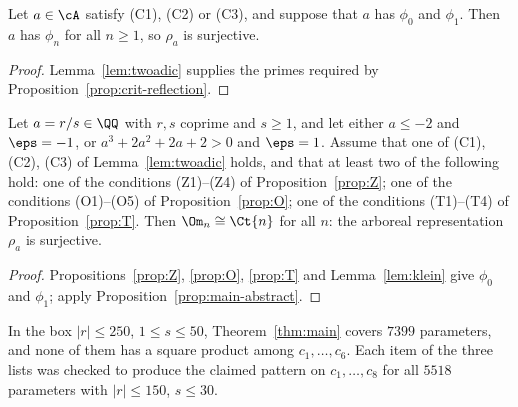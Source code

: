 \begin{proposition}
  \label{prop:main-abstract}
  \leanok
  Let $a \in \cA$ satisfy (C1), (C2) or (C3), and suppose that $a$ has $\phi_0$ and $\phi_1$.
  Then $a$ has $\phi_n$ for all $n \ge 1$, so $\rho_a$ is surjective.
\end{proposition}
\begin{proof}
  \leanok
  Lemma~\ref{lem:twoadic} supplies the primes required by Proposition~\ref{prop:crit-reflection}.
\end{proof}

\begin{theorem}
  \label{thm:main}
  \leanok
  Let $a = r/s \in \QQ$ with $r, s$ coprime and $s \ge 1$, and let either $a \le -2$ and $\eps = -1$,
  or $a^3 + 2a^2 + 2a + 2 > 0$ and $\eps = 1$. Assume that one of (C1), (C2),
  (C3) of Lemma~\ref{lem:twoadic} holds, and that at least two of the following hold: one of the
  conditions (Z1)--(Z4) of Proposition~\ref{prop:Z}; one of the conditions (O1)--(O5) of
  Proposition~\ref{prop:O}; one of the conditions (T1)--(T4) of Proposition~\ref{prop:T}. Then
  $\Om_n \cong \Ct{n}$ for all $n$: the arboreal representation $\rho_a$ is surjective.
\end{theorem}
\begin{proof}
  \leanok
  Propositions~\ref{prop:Z}, \ref{prop:O}, \ref{prop:T} and Lemma~\ref{lem:klein} give $\phi_0$
  and $\phi_1$; apply Proposition~\ref{prop:main-abstract}.
\end{proof}

\begin{remark}
  In the box $|r| \le 250$, $1 \le s \le 50$, Theorem~\ref{thm:main} covers $7399$ parameters, and
  none of them has a square product among $c_1, \dots, c_6$. Each item of the three lists was
  checked to produce the claimed pattern on $c_1, \dots, c_8$ for all $5518$ parameters with
  $|r| \le 150$, $s \le 30$.
\end{remark}

